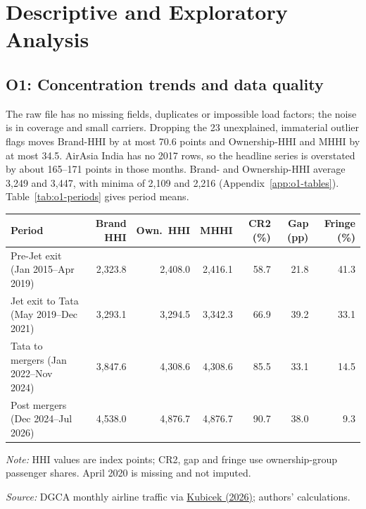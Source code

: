 \documentclass[12pt,a4paper]{article}
\newif\ifoneon
\newcommand{\oneHL}{\par\oneontrue\color{orange}\captionsetup{font+={color=blue}}}
\begin{document}
\section{Descriptive and Exploratory Analysis}
{\oneHL \subsection{O1: Concentration trends and data quality}
 The raw file has no missing fields, duplicates or impossible load factors; the noise is in coverage and small carriers. Dropping the 23 unexplained, immaterial outlier flags moves Brand-HHI by at most 70.6 points and Ownership-HHI and MHHI by at most 34.5. AirAsia India has no 2017 rows, so the headline series is overstated by about 165--171 points in those months. Brand- and Ownership-HHI average 3,249 and 3,447, with minima of 2,109 and 2,216 (Appendix~\ref{app:o1-tables}). Table~\ref{tab:o1-periods} gives period means.

\begin{minipage}{\linewidth}
\label{tab:o1-periods}
\centering
{\small{}\setlength{\tabcolsep}{4pt}
\begin{tabular}{@{}p{4.4cm}rrrrrr@{}}
\toprule
Period & Brand HHI & Own.\ HHI & MHHI & CR2 (\%) & Gap (pp) & Fringe (\%) \\
\midrule
Pre-Jet exit (Jan 2015--Apr 2019) & 2{,}323.8 & 2{,}408.0 & 2{,}416.1 & 58.7 & 21.8 & 41.3 \\
Jet exit to Tata (May 2019--Dec 2021) & 3{,}293.1 & 3{,}294.5 & 3{,}342.3 & 66.9 & 39.2 & 33.1 \\
Tata to mergers (Jan 2022--Nov 2024) & 3{,}847.6 & 4{,}308.6 & 4{,}308.6 & 85.5 & 33.1 & 14.5 \\
Post mergers (Dec 2024--Jul 2026) & 4{,}538.0 & 4{,}876.7 & 4{,}876.7 & 90.7 & 38.0 & 9.3 \\
\bottomrule
\end{tabular}\par}
\vspace{4pt}
{\footnotesize{}\raggedright\textit{Note:} HHI values are index points; CR2, gap and fringe use ownership-group passenger shares. April 2020 is missing and not imputed.\par
\textit{Source:} DGCA monthly airline traffic via \href{https://github.com/mkubicek/india-aviation-stats/tree/16770ac59dae61ce7b80fd8bd67dd7f4cef280a6}{Kubicek (2026)}; authors' calculations.\par}
\end{minipage}
\par}
\end{document}
